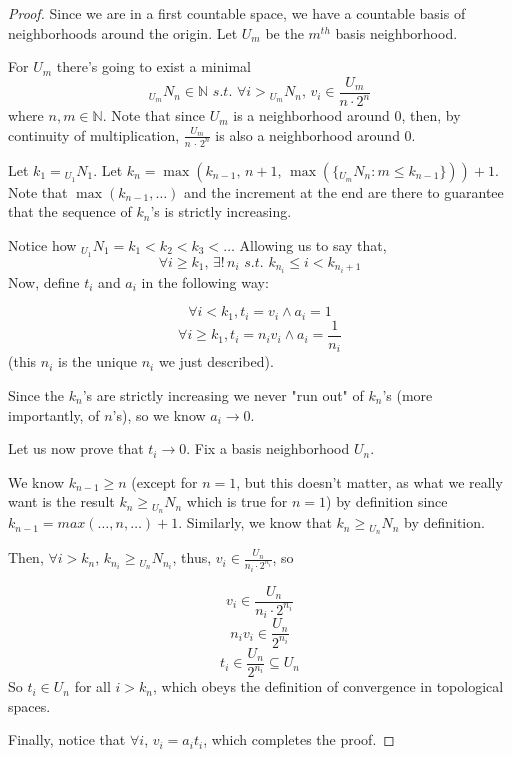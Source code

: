 \documentclass[11pt,letterpaper,fleqn]{memoir}
\begin{document}
\begin{proof}
Since we are in a first countable space, we have a countable basis of neighborhoods around the origin. Let $U_{m}$ be the $m^{th}$ basis neighborhood.

For $U_{m}$ there's going to exist a minimal $${}_{U_{m}}N_{n} \in \mathbb{N}\,\, s.t.\,\, \forall i > {}_{U_{m}}N_{n},\, v_{i} \in \frac{U_{m}}{n \cdot 2^n}$$ where $n, m \in \mathbb{N}$. Note that since $U_{m}$ is a neighborhood around 0, then, by continuity of multiplication, $\frac{U_{m}}{n \,\cdot\, 2^n}$ is also a neighborhood around 0.

Let $k_{1} = {}_{U_{1}}N_{1}$.
Let $k_{n} = \max(k_{n-1},\, n + 1,\, \max(\{{}_{U_{m}}N_{n} : m \leq k_{n-1}\})) + 1$. Note that $\max(k_{n-1}, \dots)$ and the increment at the end are there to guarantee that the sequence of $k_{n}$'s is strictly increasing.

Notice how ${}_{U_{1}}N_{1} = k_{1} < k_{2} < k_{3} < \dots$ Allowing us to say that,
$$\forall i \geq k_{1},\, \exists!\,n_{i}\,\,s.t.\,\, k_{n_{i}} \leq i < k_{n_{i}+1}$$
Now, define $t_{i}$ and $a_{i}$ in the following way:

$$
\forall i < k_{1}, t_{i} = v_{i} \land a_{i} = 1
$$
$$
\forall i \geq k_{1}, t_{i} = n_{i}v_{i} \land a_{i} = \frac{1}{n_{i}}
$$
(this $n_{i}$ is the unique $n_{i}$ we just described).

Since the $k_{n}$'s are strictly increasing we never "run out" of $k_{n}$'s (more importantly, of $n$'s), so we know $a_{i} \to 0$.

Let us now prove that $t_{i} \to 0$. Fix a basis neighborhood $U_{n}$.

We know $k_{n-1} \geq n$ (except for $n = 1$, but this doesn't matter, as what we really want is the result $k_{n} \geq {}_{U_{n}}N_{n}$ which is true for $n = 1$) by definition since $k_{n-1} =  max(\dots, n, \dots) + 1$. Similarly, we know that $k_{n} \geq {}_{U_{n}}N_{n}$ by definition.

Then, $\forall i > k_{n}$, $k_{n_{i}} \geq {}_{U_{n}}N_{n_{i}}$, thus, $v_{i} \in \frac{U_{n}}{n_{i} \cdot 2^{n_{i}}}$, so

$$
v_{i} \in \frac{U_{n}}{n_{i} \cdot 2^{n_{i}}}
$$
$$
n_{i}v_{i} \in \frac{U_{n}}{2^{n_{i}}}
$$
$$
t_{i} \in \frac{U_{n}}{2^{n_{i}}} \subseteq U_{n}
$$
So $t_{i} \in U_{n}$ for all $i > k_{n}$, which obeys the definition of convergence in topological spaces.

Finally, notice that $\forall i$, $v_{i} = a_{i}t_{i}$, which completes the proof.
\end{proof}
\end{document}
